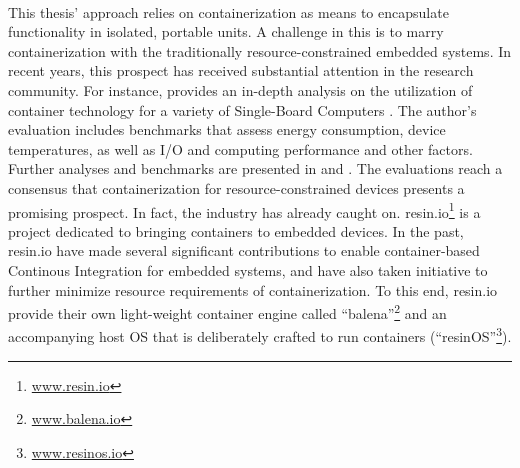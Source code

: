 \paragraph{}
This thesis' approach relies on containerization as means to encapsulate functionality in isolated, portable units. A challenge in this is to marry containerization with the traditionally resource-constrained embedded systems. In recent years, this prospect has received substantial attention in the research community. For instance, \citeauthor*{morabito2017virtualization} provides an in-depth analysis on the utilization of container technology for a variety of Single-Board Computers \cite{morabito2017virtualization}. The author's evaluation includes benchmarks that assess energy consumption, device temperatures, as well as I/O and computing performance and other factors.
Further analyses and benchmarks are presented in \cite{pahl2015containers} and \cite{bellavista2017feasibility}.  
The evaluations reach a consensus that containerization for resource-constrained devices presents a promising prospect. 
In fact, the industry has already caught on.
resin.io\footnote{\url{www.resin.io}} is a project dedicated to bringing containers to embedded devices. In the past, resin.io have made several significant contributions to enable container-based Continous Integration for embedded systems, and have also taken initiative to further minimize resource requirements of containerization. To this end, resin.io provide their own light-weight container engine called ``balena''\footnote{\url{www.balena.io}} and an accompanying host OS that is deliberately crafted to run containers (``resinOS''\footnote{\url{www.resinos.io}}).



